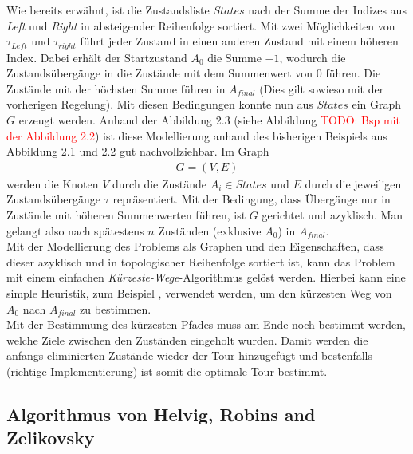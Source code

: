 \documentclass[german,version-2019-11]{uzl-thesis}
\begin{document}
Wie bereits erwähnt, ist die Zustandsliste $States$ nach der Summe der Indizes aus \emph{Left} und \emph{Right} in absteigender Reihenfolge sortiert. Mit zwei Möglichkeiten von $\tau_{Left}$ und $\tau_{right}$ führt jeder Zustand in einen anderen Zustand mit einem höheren Index. Dabei erhält der Startzustand $A_0$ die Summe $-1$, wodurch die Zustandsübergänge in die Zustände mit dem Summenwert von $0$ führen. Die Zustände mit der höchsten Summe führen in $A_{final}$ (Dies gilt sowieso mit der vorherigen Regelung). Mit diesen Bedingungen konnte nun aus $States$ ein Graph $G$ erzeugt werden. Anhand der Abbildung 2.3 (siehe Abbildung \textcolor{red}{TODO: Bsp mit der Abbildung 2.2}) ist diese Modellierung anhand des bisherigen Beispiels aus Abbildung 2.1 und 2.2 gut nachvollziehbar. Im Graph
\begin{align*}
G = (V,E)
\end{align*}
werden die Knoten $V$ durch die Zustände $A_i \in States$ und $E$ durch die jeweiligen Zustandsübergänge $\tau$ repräsentiert. Mit der Bedingung, dass Übergänge nur in Zustände mit höheren Summenwerten führen, ist $G$ gerichtet und azyklisch. Man gelangt also nach spätestens $n$ Zuständen (exklusive $A_0$) in $A_{final}$. \\
Mit der Modellierung des Problems als Graphen und den Eigenschaften, dass dieser azyklisch und in topologischer Reihenfolge sortiert ist, kann das Problem mit einem einfachen \emph{Kürzeste-Wege}-Algorithmus gelöst werden. Hierbei kann eine simple Heuristik, zum Beispiel \cite{brandstadt1994kurzeste}, verwendet werden, um den kürzesten Weg von $A_0$ nach $A_{final}$ zu bestimmen.\\
Mit der Bestimmung des kürzesten Pfades muss am Ende noch bestimmt werden, welche Ziele zwischen den Zuständen eingeholt wurden. Damit werden die anfangs eliminierten Zustände wieder der Tour hinzugefügt und bestenfalls (richtige Implementierung) ist somit die optimale Tour bestimmt.

\subsection{Algorithmus von Helvig, Robins and Zelikovsky}
\end{document}
